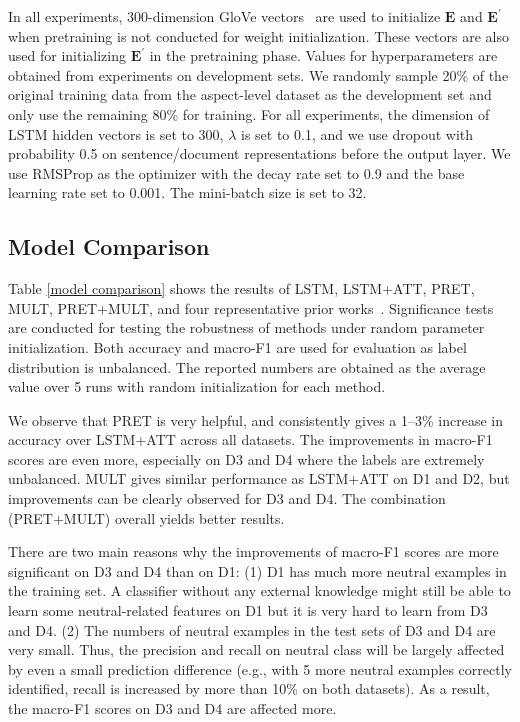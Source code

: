 \documentclass[11pt,a4paper]{article}
\begin{document}
In all experiments, 300-dimension GloVe vectors~\cite{Pennington:14} are used to initialize $\mathbf{E}$ and $\mathbf{E}^\prime$ when pretraining is not conducted for weight initialization. These vectors are also used for initializing $\mathbf{E}^\prime$ in the pretraining phase. Values for hyperparameters are obtained from experiments on development sets. We randomly sample 20\% of the original training data from the aspect-level dataset as the development set and only use the remaining 80\% for training. For all experiments, the dimension of LSTM hidden vectors is set to 300, $\lambda$ is set to 0.1, and we use dropout with probability 0.5 on sentence/document representations before the output layer. We use RMSProp as the optimizer with the decay rate set to 0.9 and the base learning rate set to 0.001. The mini-batch size is set to 32.

\subsection{Model Comparison}
Table \ref{model comparison} shows the results of LSTM, LSTM+ATT, PRET, MULT, PRET+MULT, and four representative prior works~\cite{Tang:16a,Tang:16b,Wang:16,Chen:17}.  Significance tests are conducted for testing the robustness of methods under random parameter initialization.
Both accuracy and macro-F1 are used for evaluation as label distribution is unbalanced. The reported numbers are obtained as the average value over 5 runs with random initialization for each method. 

We observe that PRET is very helpful, and consistently gives a 1--3\% increase in accuracy over LSTM+ATT across all datasets. The improvements in macro-F1 scores are even more, especially on D3 and D4 where the labels are extremely unbalanced. 
MULT gives similar performance as LSTM+ATT on D1 and D2, but improvements can be clearly observed for D3 and D4. The combination (PRET+MULT) overall yields better results.

There are two main reasons why the improvements of macro-F1 scores are more significant on D3 and D4 than on D1: (1) D1 has much more neutral examples in the training set. A classifier without any external knowledge might still be able to learn some neutral-related features on D1 but it is very hard to learn from D3 and D4. (2) The numbers of neutral examples in the test sets of D3 and D4 are very small. Thus, the precision and recall on neutral class will be largely affected by even a small prediction difference (e.g., with 5 more neutral examples correctly identified, recall is increased by more than 10\% on both datasets). As a result, the macro-F1 scores on D3 and D4 are affected more.
\end{document}
